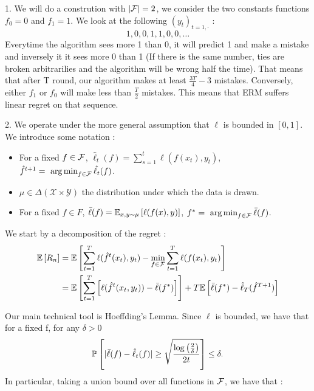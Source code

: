 \begin{solution}[]
1. We will do a constrution with $ |\F| = 2 $, we consider the two constants functions $ f_0 = 0 $ and $ f_1 = 1 $. We
look at the following $ (y_t)_{t=1,\cdot } $ :
\begin{equation*}
	1,0,0,1,1,0,0,\ldots
\end{equation*}
Everytime the algorithm sees more 1 than 0, it will predict 1 and make a mistake and inversely it it sees more 0 than 1
(If there is the same number, ties are broken arbitrarilies and the algorithm will be wrong half the time). That means that
after T round, our algorithm makes at least $ \frac{3T}{4} - 3 $ mistakes. Conversely, either $ f_1 $ or $ f_0 $ will
make less than $ \frac{T}{2} $ mistakes. This means that ERM suffers linear regret on that sequence.
\vspace{5mm}

2. We operate under the more general assumption that $ \ell $ is bounded in $ [0,1] $. We introduce some notation :
\begin{itemize}

	\item For a fixed $ f\in \F $, $ \hat{\ell}_t(f) = \sum_{s=1}^{t} \ell(f(x_t),y_t) $, $ \hat{f}^{t+1} = \argmin_{f \in
		\F} \hat{\ell_t}(f) $.
	\item $ \mu \in \Delta(\mathcal{X}\times \mathcal{Y}) $ the distribution under which the data is drawn.
	\item For a fixed $ f\in F $, $ \bar{\ell}(f) = \EEs{\ell(f(x),y)}{x,y\sim \mu} $, $ f^{*} = \argmin_{f\in \F}
		\bar{\ell}(f) $.
\end{itemize}
We start by a decomposition of the regret :
\begin{align*}
	\EE{R_n} &= \EE{\sum_{t=1}^{T}\ell(\hat{f}^{t}(x_t),y_t) - \min_{f\in \F}\sum_{t=1}^{T}\ell(f(x_t),y_t)}\\
		 &=\EE{\sum_{t=1}^{T}\left[\ell(\hat{f}^t(x_t,y_t)) - \bar{\ell}(f^{*})\right]} + T\EE{\bar{\ell}(f^{*})-
		 \hat{\ell}_T(\hat{f}^{T+1})}
\end{align*}

Our main technical tool is Hoeffding's Lemma. Since $ \ell $ is bounded, we have that for a fixed f, for any $
\delta > 0 $
\begin{equation*}
	\PP{|\bar{\ell}(f) - \hat{\ell}_t(f)| \geq \sqrt{\frac{\log \left( \frac{2}{\delta} \right)}{2t}}} \leq \delta.
\end{equation*}
In particular, taking a union bound over all functions in $ \F $, we have that :


\end{solution}
